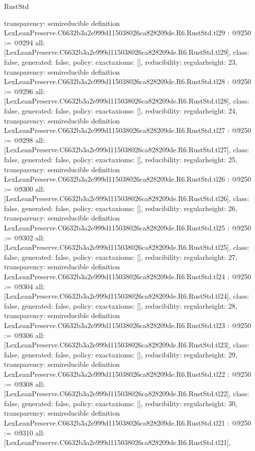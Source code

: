 \begin{lexlean}{RustStd}
\begin{coremodule}
{  transparency: semireducible
}
definition LexLeanPreserve.C6632b3a2e999d115038026ca828209de.R6.RustStd.tl29 : @9250 := @9294 {
  all: [LexLeanPreserve.C6632b3a2e999d115038026ca828209de.R6.RustStd.tl29],
  class: false,
  generated: false,
  policy: exact{axioms: []},
  reducibility: regular{height: 23},
  transparency: semireducible
}
definition LexLeanPreserve.C6632b3a2e999d115038026ca828209de.R6.RustStd.tl28 : @9250 := @9296 {
  all: [LexLeanPreserve.C6632b3a2e999d115038026ca828209de.R6.RustStd.tl28],
  class: false,
  generated: false,
  policy: exact{axioms: []},
  reducibility: regular{height: 24},
  transparency: semireducible
}
definition LexLeanPreserve.C6632b3a2e999d115038026ca828209de.R6.RustStd.tl27 : @9250 := @9298 {
  all: [LexLeanPreserve.C6632b3a2e999d115038026ca828209de.R6.RustStd.tl27],
  class: false,
  generated: false,
  policy: exact{axioms: []},
  reducibility: regular{height: 25},
  transparency: semireducible
}
definition LexLeanPreserve.C6632b3a2e999d115038026ca828209de.R6.RustStd.tl26 : @9250 := @9300 {
  all: [LexLeanPreserve.C6632b3a2e999d115038026ca828209de.R6.RustStd.tl26],
  class: false,
  generated: false,
  policy: exact{axioms: []},
  reducibility: regular{height: 26},
  transparency: semireducible
}
definition LexLeanPreserve.C6632b3a2e999d115038026ca828209de.R6.RustStd.tl25 : @9250 := @9302 {
  all: [LexLeanPreserve.C6632b3a2e999d115038026ca828209de.R6.RustStd.tl25],
  class: false,
  generated: false,
  policy: exact{axioms: []},
  reducibility: regular{height: 27},
  transparency: semireducible
}
definition LexLeanPreserve.C6632b3a2e999d115038026ca828209de.R6.RustStd.tl24 : @9250 := @9304 {
  all: [LexLeanPreserve.C6632b3a2e999d115038026ca828209de.R6.RustStd.tl24],
  class: false,
  generated: false,
  policy: exact{axioms: []},
  reducibility: regular{height: 28},
  transparency: semireducible
}
definition LexLeanPreserve.C6632b3a2e999d115038026ca828209de.R6.RustStd.tl23 : @9250 := @9306 {
  all: [LexLeanPreserve.C6632b3a2e999d115038026ca828209de.R6.RustStd.tl23],
  class: false,
  generated: false,
  policy: exact{axioms: []},
  reducibility: regular{height: 29},
  transparency: semireducible
}
definition LexLeanPreserve.C6632b3a2e999d115038026ca828209de.R6.RustStd.tl22 : @9250 := @9308 {
  all: [LexLeanPreserve.C6632b3a2e999d115038026ca828209de.R6.RustStd.tl22],
  class: false,
  generated: false,
  policy: exact{axioms: []},
  reducibility: regular{height: 30},
  transparency: semireducible
}
definition LexLeanPreserve.C6632b3a2e999d115038026ca828209de.R6.RustStd.tl21 : @9250 := @9310 {
  all: [LexLeanPreserve.C6632b3a2e999d115038026ca828209de.R6.RustStd.tl21],
}
\end{coremodule}
\end{lexlean}
